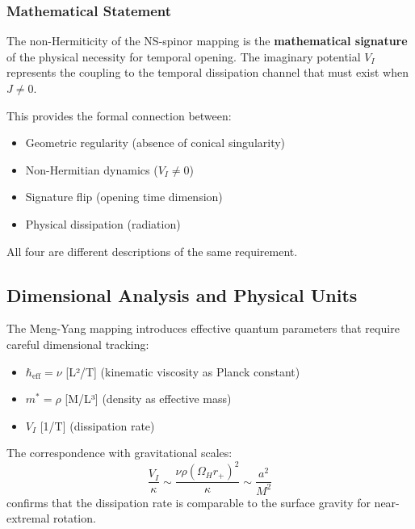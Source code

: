 \documentclass[11pt]{article}
\begin{document}
\subsubsection{Mathematical Statement}

The non-Hermiticity of the NS-spinor mapping is the \textbf{mathematical signature} of the physical necessity for temporal opening. The imaginary potential $V_I$ represents the coupling to the temporal dissipation channel that must exist when $J \neq 0$.

This provides the formal connection between:
\begin{itemize}
\item Geometric regularity (absence of conical singularity)
\item Non-Hermitian dynamics ($V_I \neq 0$)
\item Signature flip (opening time dimension)
\item Physical dissipation (radiation)
\end{itemize}

All four are different descriptions of the same requirement.

\subsection{Dimensional Analysis and Physical Units}

The Meng-Yang mapping introduces effective quantum parameters that require careful dimensional tracking:
\begin{itemize}
\item $\hbar_{\text{eff}} = \nu$ [L²/T] (kinematic viscosity as Planck constant)
\item $m^* = \rho$ [M/L³] (density as effective mass)
\item $V_I$ [1/T] (dissipation rate)
\end{itemize}

The correspondence with gravitational scales:
\begin{equation}
\frac{V_I}{\kappa} \sim \frac{\nu\rho(\Omega_H r_+)^2}{\kappa} \sim \frac{a^2}{M^2}
\end{equation}
confirms that the dissipation rate is comparable to the surface gravity for near-extremal rotation.
\end{document}
